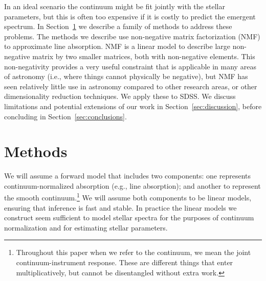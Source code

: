 \documentclass[modern]{aastex631}
\newcommand{\project}[1]{\textit{#1}}
\newcommand{\sdss}{\project{SDSS}}
\newcommand{\todo}[1]{\textcolor{tab:red}{#1}}
\begin{document}
In an ideal scenario the continuum might be fit jointly with the stellar parameters, but this is often too expensive if it is costly to predict the emergent spectrum. In Section~\ref{sec:methods} we describe a family of methods to address these problems. 
The methods we describe use non-negative matrix factorization (NMF) to approximate line absorption. NMF is a linear model to describe large non-negative matrix by two smaller matrices, both with non-negative elements. This non-negativity provides a very useful constraint that is applicable in many areas of astronomy (i.e., where things cannot physically be negative), but NMF has seen relatively little use in astronomy compared to other research areas, or other dimensionality reduction techniques. 
\todo{We apply these to SDSS.}
We discuss limitations and potential extensions of our work in Section~\ref{sec:discussion}, before concluding in Section~\ref{sec:conclusions}.\\

\section{Methods}\label{sec:methods}

We will assume a forward model that includes two components: one represents continuum-normalized absorption (e.g., line absorption); and another to represent the smooth continuum.\footnote{Throughout this paper when we refer to the continuum, we mean the joint continuum-instrument response. These are different things that enter multiplicatively, but cannot be disentangled without extra work.} We will assume both components to be linear models, ensuring that inference is fast and stable. In practice the linear models we construct seem sufficient to model stellar spectra for the purposes of continuum normalization and for estimating stellar parameters.\\



\end{document}
